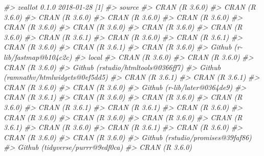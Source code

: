 \documentclass[
  12pt,
]{krantz}
\newenvironment{Shaded}{\begin{snugshade}}{\end{snugshade}}
\newcommand{\CommentTok}[1]{\textcolor[rgb]{0.56,0.35,0.01}{\textit{#1}}}
\begin{document}
\begin{Shaded}
\begin{Highlighting}[]
\CommentTok{#>  zeallot        0.1.0      2018-01-28 [1]}
\CommentTok{#>  source                               }
\CommentTok{#>  CRAN (R 3.6.0)                       }
\CommentTok{#>  CRAN (R 3.6.0)                       }
\CommentTok{#>  CRAN (R 3.6.0)                       }
\CommentTok{#>  CRAN (R 3.6.0)                       }
\CommentTok{#>  CRAN (R 3.6.0)                       }
\CommentTok{#>  CRAN (R 3.6.0)                       }
\CommentTok{#>  CRAN (R 3.6.0)                       }
\CommentTok{#>  CRAN (R 3.6.0)                       }
\CommentTok{#>  CRAN (R 3.6.0)                       }
\CommentTok{#>  CRAN (R 3.6.1)                       }
\CommentTok{#>  CRAN (R 3.6.0)                       }
\CommentTok{#>  CRAN (R 3.6.1)                       }
\CommentTok{#>  CRAN (R 3.6.0)                       }
\CommentTok{#>  CRAN (R 3.6.1)                       }
\CommentTok{#>  CRAN (R 3.6.0)                       }
\CommentTok{#>  Github (r-lib/fastmap@b104c2c)       }
\CommentTok{#>  local                                }
\CommentTok{#>  CRAN (R 3.6.0)                       }
\CommentTok{#>  CRAN (R 3.6.0)                       }
\CommentTok{#>  CRAN (R 3.6.0)                       }
\CommentTok{#>  Github (rstudio/htmltools@0366ff7)   }
\CommentTok{#>  Github (ramnathv/htmlwidgets@0ef5dd5)}
\CommentTok{#>  CRAN (R 3.6.1)                       }
\CommentTok{#>  CRAN (R 3.6.1)                       }
\CommentTok{#>  CRAN (R 3.6.0)                       }
\CommentTok{#>  CRAN (R 3.6.0)                       }
\CommentTok{#>  Github (r-lib/later@0364de9)         }
\CommentTok{#>  CRAN (R 3.6.1)                       }
\CommentTok{#>  CRAN (R 3.6.0)                       }
\CommentTok{#>  CRAN (R 3.6.0)                       }
\CommentTok{#>  CRAN (R 3.6.0)                       }
\CommentTok{#>  CRAN (R 3.6.1)                       }
\CommentTok{#>  CRAN (R 3.6.1)                       }
\CommentTok{#>  CRAN (R 3.6.0)                       }
\CommentTok{#>  CRAN (R 3.6.0)                       }
\CommentTok{#>  CRAN (R 3.6.0)                       }
\CommentTok{#>  CRAN (R 3.6.0)                       }
\CommentTok{#>  CRAN (R 3.6.1)                       }
\CommentTok{#>  CRAN (R 3.6.0)                       }
\CommentTok{#>  CRAN (R 3.6.1)                       }
\CommentTok{#>  CRAN (R 3.6.0)                       }
\CommentTok{#>  CRAN (R 3.6.0)                       }
\CommentTok{#>  CRAN (R 3.6.0)                       }
\CommentTok{#>  Github (rstudio/promises@39faf86)    }
\CommentTok{#>  Github (tidyverse/purrr@9edf0ca)     }
\CommentTok{#>  CRAN (R 3.6.0)                       }

\end{Highlighting}
\end{Shaded}
\end{document}
